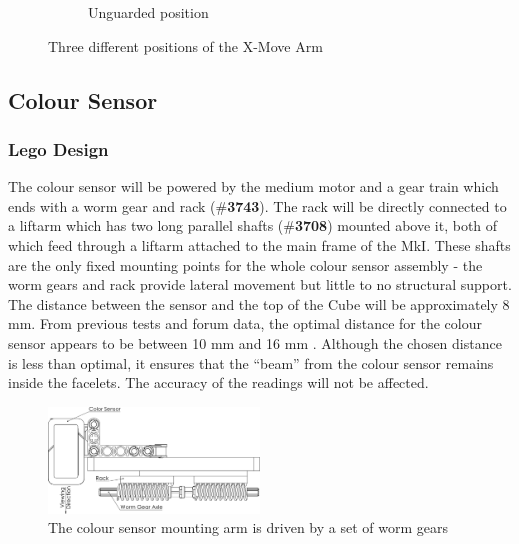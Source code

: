 \documentclass{report}
\newcommand{\tbo}[1]{\textbf{#1}}
\newcommand{\legopiece}[1]{(\#\tbo{#1})}
\begin{document}
\begin{figure}[H]
\begin{subfigure}[b]{0.30811\textwidth}
			\caption{Unguarded position}
			\label{fig:rdrXMoveArmV1_3}
		\end{subfigure}
		\caption{Three different positions of the X-Move Arm}
		\label{fig:rdrXMoveArmV1}
	\end{figure}
	

	\subsection{Colour Sensor}
	
	\subsubsection{Lego Design}
	
	The colour sensor will be powered by the medium motor and a gear train which ends with a worm gear and rack \legopiece{3743}. The rack will be directly connected to a liftarm which has two long parallel shafts \legopiece{3708} mounted above it, both of which feed through a liftarm attached to the main frame of the MkI. These shafts are the only fixed mounting points for the whole colour sensor assembly - the worm gears and rack provide lateral movement but little to no structural support. The distance between the sensor and the top of the Cube will be approximately 8 \si{\milli\metre}. From previous tests and forum data, the optimal distance for the colour sensor appears to be between 10 \si{\milli\metre} and 16 \si{\milli\metre} \cite{UlfR2015}. Although the chosen distance is less than optimal, it ensures that the \enquote{beam} from the colour sensor remains inside the facelets. The accuracy of the readings will not be affected.
	
	\begin{figure}[H]
		\begin{center}
			\includegraphics[width=0.5\textwidth]{Resources/Images/dwgColorSensor.png}
			\caption{The colour sensor mounting arm is driven by a set of worm gears}
			\label{fig:dwgColorSensor}
		\end{center}
	\end{figure}
	
\end{document}
